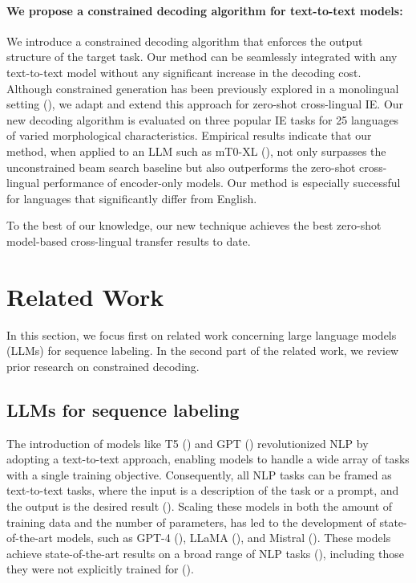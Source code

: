 \paragraph{We propose a constrained decoding algorithm for text-to-text models:} We introduce a constrained decoding algorithm that enforces the output structure of the target task. Our method can be seamlessly integrated with any text-to-text model without any significant increase in the decoding cost. Although constrained generation has been previously explored in a monolingual setting (\cite{liu-etal-2022-autoregressive}), we adapt and extend this approach for zero-shot cross-lingual IE. Our new decoding algorithm is evaluated on three popular IE tasks for 25 languages of varied morphological characteristics. Empirical results indicate that our method, when applied to an LLM such as mT0-XL (\cite{DBLP:conf/acl/MuennighoffWSRB23}), not only surpasses the unconstrained beam search baseline but also outperforms the zero-shot cross-lingual performance of encoder-only models. Our method is especially successful for languages that significantly differ from English.

To the best of our knowledge, our new technique achieves the best zero-shot model-based cross-lingual transfer results to date.


\section{Related Work}
In this section, we focus first on related work concerning large language models (LLMs) for sequence labeling. In the second part of the related work, we review prior research on constrained decoding.

\subsection{LLMs for sequence labeling}

The introduction of models like T5 (\cite{DBLP:journals/jmlr/RaffelSRLNMZLL20-T5}) and GPT (\cite{radford2019language}) revolutionized NLP by adopting a text-to-text approach, enabling models to handle a wide array of tasks with a single training objective. Consequently, all NLP tasks can be framed as text-to-text tasks, where the input is a description of the task or a prompt, and the output is the desired result (\cite{chung-flan-instruction-models}). Scaling these models in both the amount of training data and the number of parameters, has led to the development of state-of-the-art models, such as GPT-4 (\cite{openai2024gpt4technicalreport}), LLaMA (\cite{llama3modelcard}), and Mistral (\cite{jiang2023mistral7b}). These models achieve state-of-the-art results on a broad range of NLP tasks (\cite{DBLP:journals/csur/MinRSVNSAHR24}), including those they were not explicitly trained for (\cite{radford2019language}).

